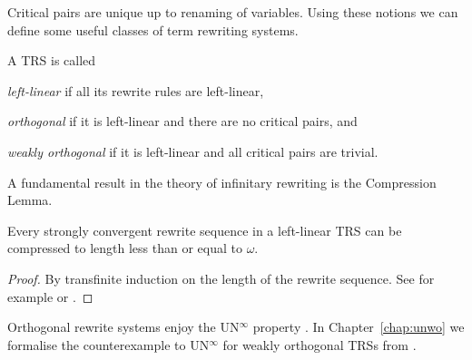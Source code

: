 Critical pairs are unique up to renaming of variables. Using these
notions we can define some useful classes of term rewriting systems.



\begin{definition}%
A TRS is called
\begin{compactenum}
  \item \emph{left-linear} if all its rewrite rules are left-linear,
  \item \emph{orthogonal} if it is left-linear and there are no critical pairs, and
  \item \emph{weakly orthogonal} if it is left-linear and all critical pairs
    are trivial.
\end{compactenum}
\end{definition}

A fundamental result in the theory of infinitary rewriting is the
Compression Lemma.
\begin{lemma}\label{lem:compression}
  Every strongly convergent rewrite sequence in a left-linear TRS can
  be compressed to length less than or equal to $\omega$.
\end{lemma}
\begin{proof}
  By transfinite induction on the length of the rewrite sequence. See
  for example \citet[Theorem 12.7.1, page 689]{terese-03} or
  \citet{endrullis-10}.
\end{proof}

Orthogonal rewrite systems enjoy the UN$^\infty$ property
\citep{kennaway-95,klop-de-vrijer-05}. In Chapter~\ref{chap:unwo} we
formalise the counterexample to UN$^\infty$ for weakly orthogonal TRSs
from \citet{endrullis-10}.
